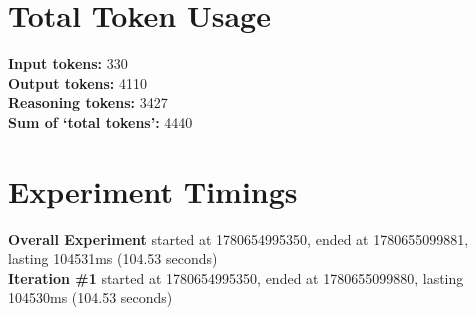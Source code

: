 \documentclass{article}
\begin{document}
\section*{Total Token Usage}
\textbf{Input tokens: }330
\\\textbf{Output tokens: }4110
\\\textbf{Reasoning tokens: }3427
\\\textbf{Sum of `total tokens': }4440
\section*{Experiment Timings}
\textbf{Overall Experiment} started at 1780654995350, ended at 1780655099881, lasting 104531ms (104.53 seconds)
\\\textbf{Iteration \#1} started at 1780654995350, ended at 1780655099880, lasting 104530ms (104.53 seconds)
\end{document}
